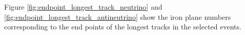 %


Figure \ref{fig:endpoint_longest_track_neutrino} and \ref{fig:endpoint_longest_track_antineutrino} show the iron plane numbers corresponding to the end points of the longest tracks in the selected events.

